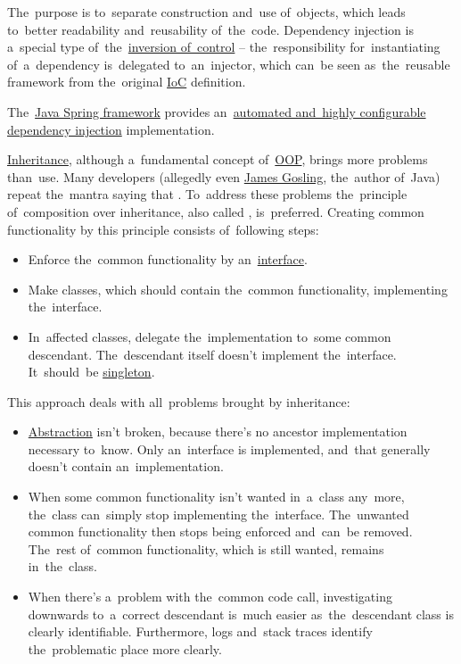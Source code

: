 The~purpose is to~separate construction and~use of~objects, which leads to~better readability and~reusability of~the~code.
Dependency injection is a~special type of~the~\hyperref[inversionofcontrol]{inversion of~control} -- the~responsibility for~instantiating of~a~dependency is~delegated to~an~injector, which can~be seen as~the~reusable framework from the~original \hyperref[inversionofcontrol]{IoC} definition.

The~\hyperref[springframework]{Java Spring framework} provides an~\hyperref[springdependencyinjection]{automated and~highly configurable dependency injection} implementation.

\label{compositionoverinheritance}
\hyperref[inheritance]{Inheritance}, although a~fundamental concept of~\hyperref[objectorientedprogramming]{OOP}, brings more problems than~use.
Many developers (allegedly even \href{https://en.wikipedia.org/wiki/James_Gosling}{James Gosling}, the~author of~Java) repeat the~mantra saying that .
To~address these problems the~principle of~composition over inheritance, also called , is~preferred.
Creating common functionality by this principle consists of~following steps:
\begin{itemize}
    \item Enforce the~common functionality by an~\hyperref[javainterface]{interface}.
    \item Make classes, which should contain the~common functionality, implementing the~interface.
    \item In~affected classes, delegate the~implementation to~some common descendant.
          The~descendant itself doesn't implement the~interface.
          It~should~be \hyperref[singletondp]{singleton}.
\end{itemize}

\noindent This approach deals with all~problems brought by inheritance:
\begin{itemize}
    \item \hyperref[abstraction]{Abstraction} isn't broken, because there's no ancestor implementation necessary to~know.
          Only an~interface is implemented, and~that generally doesn't contain an~implementation.
    \item When some common functionality isn't wanted in~a~class any~more, the~class can~simply stop implementing the~interface.
          The~unwanted common functionality then stops being enforced and~can~be removed.
          The~rest of~common functionality, which is still wanted, remains in~the~class.
    \item When there's a~problem with the~common code call, investigating downwards to~a~correct descendant is~much easier as~the~descendant class is clearly identifiable.
          Furthermore, logs and~stack traces identify the~problematic place more clearly.
\end{itemize}

